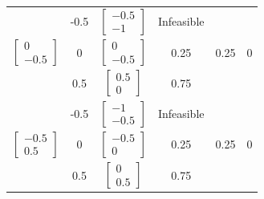 \begin{latin}
\begin{longtable}{|c|c|c|c|c|c|}
		& -0.5 &$\begin{bmatrix} -0.5 \\ -1 \end{bmatrix}$      & Infeasible                        &             &      \\ \cline{2-4}
		\multirow{-3}{*}{$\begin{bmatrix} 0 \\ -0.5 \end{bmatrix}$}& 0    &$\begin{bmatrix} 0 \\ -0.5 \end{bmatrix}$      &     0.25                   &    0.25        &  0     \\ \cline{2-4}
		& 0.5  &$\begin{bmatrix} 0.5 \\ 0 \end{bmatrix}$      &    0.75                     &          &       \\ \hline
		
		&          -0.5              &$\begin{bmatrix} -1 \\ -0.5 \end{bmatrix}$      & Infeasible                        &       &          \\  \cline{2-4} 
		\multirow{-3}{*}{$\begin{bmatrix} -0.5 \\ 0.5 \end{bmatrix}$}&     0                   &$\begin{bmatrix} -0.5 \\ 0 \end{bmatrix}$      &     0.25                   &  0.25           &   0    \\  \cline{2-4} 
		&         0.5               &$\begin{bmatrix} 0 \\ 0.5 \end{bmatrix}$      &        0.75                    &          &      \\  \cline{2-4} \hline
		

\end{longtable}
\end{latin}
